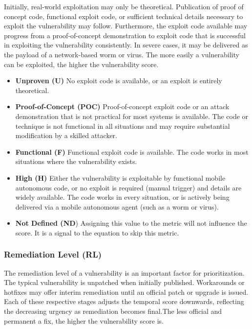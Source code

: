   Initially, real-world exploitation may only be theoretical. Publication
  of proof of concept code, functional exploit code, or sufficient
  technical details necessary to exploit the vulnerability may follow.
  Furthermore, the exploit code available may progress from a
  proof-of-concept demonstration to exploit code that is successful in
  exploiting the vulnerability consistently. In severe cases, it may be
  delivered as the payload of a network-based worm or virus. The more
  easily a vulnerability can be exploited, the higher the vulnerability
  score.

  \begin{itemize}
  \item
    \textbf{Unproven (U)} No exploit code is available, or an exploit is
    entirely theoretical.
  \item
    \textbf{Proof-of-Concept (POC)} Proof-of-concept exploit code or an
    attack demonstration that is not practical for most systems is
    available. The code or technique is not functional in all situations
    and may require substantial modification by a skilled attacker.
  \item
    \textbf{Functional (F)} Functional exploit code is available. The code
    works in most situations where the vulnerability exists.
  \item
    \textbf{High (H)} Either the vulnerability is exploitable by
    functional mobile autonomous code, or no exploit is required (manual
    trigger) and details are widely available. The code works in every
    situation, or is actively being delivered via a mobile autonomous
    agent (such as a worm or virus).
  \item
    \textbf{Not Defined (ND}) Assigning this value to the metric will not
    influence the score. It is a signal to the equation to skip this
    metric.
  \end{itemize}

  \subsubsection{Remediation Level (RL)}\label{remediation-level-rl}

  The remediation level of a vulnerability is an important factor for
  prioritization. The typical vulnerability is unpatched when initially
  published. Workarounds or hotfixes may offer interim remediation until
  an official patch or upgrade is issued. Each of these respective stages
  adjusts the temporal score downwards, reflecting the decreasing urgency
  as remediation becomes final.The less official and permanent a fix, the
  higher the vulnerability score is.

